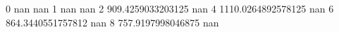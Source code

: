 0 nan nan
1 nan nan
2 909.4259033203125 nan
4 1110.0264892578125 nan
6 864.3440551757812 nan
8 757.9197998046875 nan
